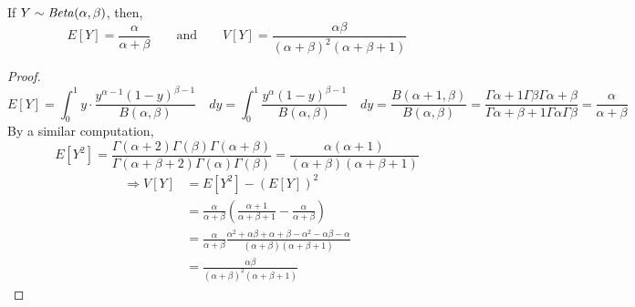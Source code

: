 \begin{theorem}
If $Y \sim \text{\emph{Beta}}(\alpha, \beta)$, then,
\[
    E[Y] = \frac{\alpha}{\alpha + \beta}
    \qquad \text{and} \qquad
    V[Y] = \frac{\alpha \beta}{(\alpha + \beta)^2 (\alpha + \beta + 1)}
\]
\end{theorem}
\begin{proof}
\[
    E[Y] = \int_{0}^{1} y \cdot \frac 
               {y^{\alpha - 1} (1 - y)^{\beta - 1}}
               {B(\alpha, \beta)}
           \quad dy
         = \int_{0}^{1} \frac 
               {y^\alpha (1 - y)^{\beta - 1}}
               {B(\alpha, \beta)}
           \quad dy
         = \frac{B(\alpha + 1, \beta)}{B(\alpha, \beta)}
         = \frac
               {\Gamma{\alpha + 1} \Gamma{\beta} \Gamma{\alpha + \beta}}
               {\Gamma{\alpha + \beta + 1} \Gamma{\alpha} \Gamma{\beta}}
         = \frac{\alpha}{\alpha + \beta}
\]
By a similar computation,
\[
    E[Y^2] = \frac{\Gamma(\alpha + 2) \Gamma(\beta) \Gamma(\alpha + \beta)}
                  {\Gamma(\alpha + \beta + 2) \Gamma(\alpha) \Gamma(\beta)}
           = \frac{\alpha (\alpha + 1)}
                  {(\alpha + \beta) (\alpha + \beta + 1)}
\]
\begin{align*}
    \Rightarrow
    V[Y] &= E[Y^2] - (E[Y])^2                                              \\
         &= \frac{\alpha}{\alpha + \beta} \left(
                \frac{\alpha + 1}{\alpha + \beta + 1} - 
                \frac{\alpha}{\alpha + \beta}
            \right)                                                        \\
         &= \frac{\alpha}{\alpha + \beta}
            \frac{\alpha^2 + \alpha \beta + \alpha + \beta - \alpha^2
                  -\alpha \beta - \alpha}
                 {(\alpha + \beta)(\alpha + \beta + 1)}                    \\
         &= \frac{\alpha \beta}{(\alpha + \beta)^2 (\alpha + \beta + 1)}
\end{align*}
\end{proof}